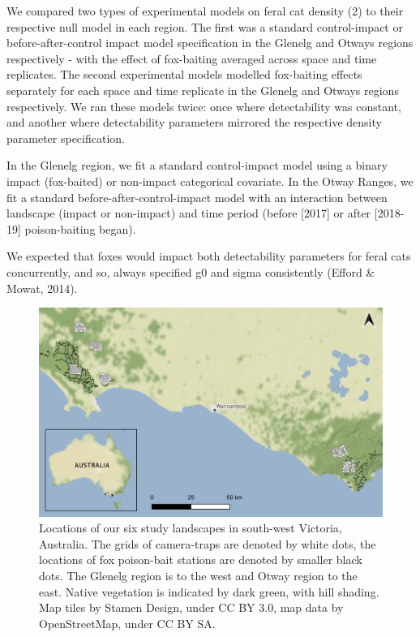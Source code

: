 \documentclass[]{elsarticle} %
\begin{document}
We compared two types of experimental models on feral cat density (2) to their respective null model in each region. The first was a standard control-impact or before-after-control impact model specification in the Glenelg and Otways regions respectively - with the effect of fox-baiting averaged across space and time replicates. The second experimental models modelled fox-baiting effects separately for each space and time replicate in the Glenelg and Otways regions respectively. We ran these models twice: once where detectability was constant, and another where detectability parameters mirrored the respective density parameter specification.

In the Glenelg region, we fit a standard control-impact model using a binary impact (fox-baited) or non-impact categorical covariate. In the Otway Ranges, we fit a standard before-after-control-impact model with an interaction between landscape (impact or non-impact) and time period (before {[}2017{]} or after {[}2018-19{]} poison-baiting began).

We expected that foxes would impact both detectability parameters for feral cats concurrently, and so, always specified g0 and sigma consistently (Efford \& Mowat, 2014).

\newpage

\begin{figure}
\includegraphics[width=1\linewidth]{figs/fig1} \caption{Locations of our six study landscapes in south-west Victoria, Australia. The grids of camera-traps are denoted by white dots, the locations of fox poison-bait stations are denoted by smaller black dots. The Glenelg region is to the west and Otway region to the east. Native vegetation is indicated by dark green, with hill shading. Map tiles by Stamen Design, under CC BY 3.0, map data by OpenStreetMap, under CC BY SA.}\label{fig:map}
\end{figure}
\end{document}
